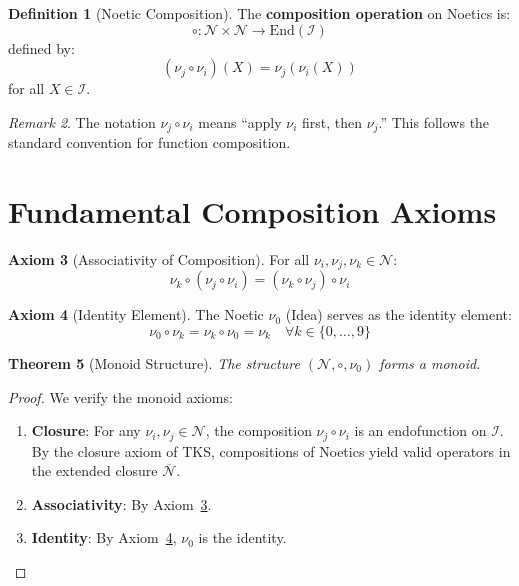 \documentclass[11pt,twoside,openright]{book}
\theoremstyle{definition}
\newtheorem{definition}{Definition}[chapter]
\newtheorem{axiom}[definition]{Axiom}
\theoremstyle{plain}
\newtheorem{theorem}[definition]{Theorem}
\theoremstyle{remark}
\newtheorem{remark}[definition]{Remark}
\newcommand{\Ideas}{\mathcal{I}}
\newcommand{\Noetics}{\mathcal{N}}
\newcommand{\noe}[1]{\nu_{#1}}
\begin{document}
\begin{definition}[Noetic Composition]
\label{def:noetic-composition}
The \textbf{composition operation} on Noetics is:
\[
\circ : \Noetics \times \Noetics \to \mathrm{End}(\Ideas)
\]
defined by:
\[
(\noe{j} \circ \noe{i})(X) = \noe{j}(\noe{i}(X))
\]
for all $X \in \Ideas$.
\end{definition}

\begin{remark}
The notation $\noe{j} \circ \noe{i}$ means ``apply $\noe{i}$ first, then $\noe{j}$.'' This follows the standard convention for function composition.
\end{remark}

\section{Fundamental Composition Axioms}

\begin{axiom}[Associativity of Composition]
\label{ax:assoc-comp}
For all $\noe{i}, \noe{j}, \noe{k} \in \Noetics$:
\[
\noe{k} \circ (\noe{j} \circ \noe{i}) = (\noe{k} \circ \noe{j}) \circ \noe{i}
\]
\end{axiom}

\begin{axiom}[Identity Element]
\label{ax:identity}
The Noetic $\noe{0}$ (Idea) serves as the identity element:
\[
\noe{0} \circ \noe{k} = \noe{k} \circ \noe{0} = \noe{k} \quad \forall k \in \{0,\ldots,9\}
\]
\end{axiom}

\begin{theorem}[Monoid Structure]
\label{thm:monoid}
The structure $(\Noetics, \circ, \noe{0})$ forms a monoid.
\end{theorem}

\begin{proof}
We verify the monoid axioms:
\begin{enumerate}
  \item \textbf{Closure}: For any $\noe{i}, \noe{j} \in \Noetics$, the composition $\noe{j} \circ \noe{i}$ is an endofunction on $\Ideas$. By the closure axiom of TKS, compositions of Noetics yield valid operators in the extended closure $\overline{\Noetics}$.
  \item \textbf{Associativity}: By Axiom~\ref{ax:assoc-comp}.
  \item \textbf{Identity}: By Axiom~\ref{ax:identity}, $\noe{0}$ is the identity.
\end{enumerate}
\end{proof}
\end{document}
